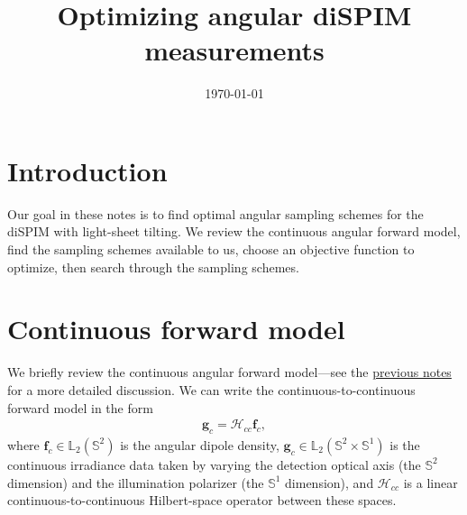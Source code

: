 \documentclass[11pt]{article}
\providecommand{\mb}[1]{\mathbf{#1}}
\providecommand{\mc}[1]{\mathcal{#1}}
\providecommand{\mbb}[1]{\mathbb{#1}}
\begin{document}
\title{\vspace{-2.5em} Optimizing angular diSPIM measurements\vspace{-1em}} %
\date{\vspace{-3em}\today\vspace{-1em}}
\maketitle

\section{Introduction}
Our goal in these notes is to find optimal angular sampling schemes for the
diSPIM with light-sheet tilting. We review the continuous angular forward model,
find the sampling schemes available to us, choose an objective function to
optimize, then search through the sampling schemes.

\section{Continuous forward model}
We briefly review the continuous angular forward model---see the
\href{https://github.com/talonchandler/polharmonic/blob/master/notes/2018-12-10-angular-svd/report/report.pdf}{previous
  notes} for a more detailed discussion. We can write the
continuous-to-continuous forward model in the form
\begin{align}
  \mb{g}_c = \mc{H}_{cc}\mb{f}_c,\label{eq:cc}
\end{align}
where $\mb{f}_c \in \mbb{L}_2(\mbb{S}^2)$ is the angular dipole density,
$\mb{g}_c \in \mbb{L}_2(\mbb{S}^2\times \mbb{S}^1)$ is the continuous irradiance
data taken by varying the detection optical axis (the $\mbb{S}^2$ dimension) and
the illumination polarizer (the $\mbb{S}^1$ dimension), and $\mc{H}_{cc}$ is a
linear continuous-to-continuous Hilbert-space operator between these spaces.
\end{document}
